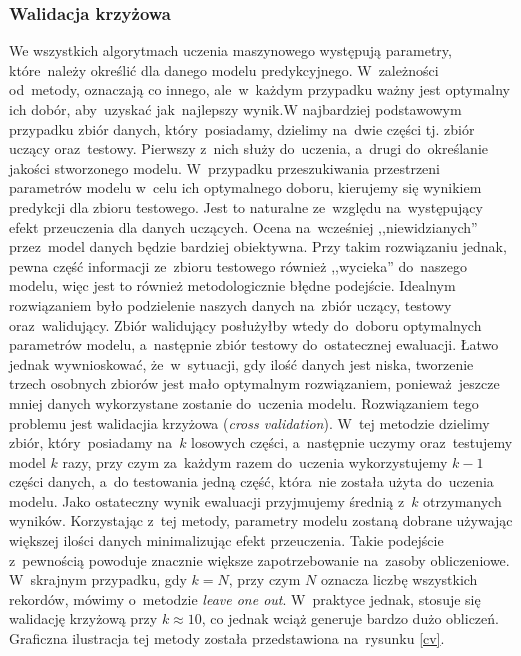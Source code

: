 \subsubsection{Walidacja krzyżowa}
We wszystkich algorytmach uczenia maszynowego występują parametry, które~należy określić dla danego modelu predykcyjnego. W~zależności od~metody, oznaczają co innego, ale~w~każdym przypadku ważny jest optymalny ich dobór, aby~uzyskać jak~najlepszy wynik.W najbardziej podstawowym przypadku zbiór danych, który~posiadamy, dzielimy na~dwie części tj. zbiór uczący oraz~testowy. Pierwszy z~nich służy do~uczenia, a~drugi do~określanie jakości stworzonego modelu. W~przypadku przeszukiwania przestrzeni parametrów modelu w~celu ich optymalnego doboru, kierujemy się wynikiem predykcji dla zbioru testowego. Jest to naturalne ze~względu na~występujący efekt przeuczenia dla danych uczących. Ocena na~wcześniej ,,niewidzianych'' przez~model danych będzie bardziej obiektywna. Przy takim rozwiązaniu jednak, pewna część informacji ze~zbioru testowego również ,,wycieka'' do~naszego modelu, więc jest to również metodologicznie błędne podejście. Idealnym rozwiązaniem było podzielenie naszych danych na~zbiór uczący, testowy oraz~walidujący. Zbiór walidujący posłużyłby wtedy do~doboru optymalnych parametrów modelu, a~następnie zbiór testowy do~ostatecznej ewaluacji. Łatwo jednak wywnioskować, że~w~sytuacji, gdy ilość danych jest niska, tworzenie trzech osobnych zbiorów jest mało optymalnym rozwiązaniem, ponieważ~jeszcze mniej danych wykorzystane zostanie do~uczenia modelu. Rozwiązaniem tego problemu jest walidacjia krzyżowa (\textit{cross validation}). W~tej metodzie dzielimy zbiór, który~posiadamy na~$k$ losowych części, a~następnie uczymy oraz~testujemy model $k$ razy, przy czym za~każdym razem do~uczenia wykorzystujemy $k-1$ części danych, a~do testowania jedną część, która~nie została użyta do~uczenia modelu. Jako ostateczny wynik ewaluacji przyjmujemy średnią z~$k$ otrzymanych wyników. Korzystając z~tej metody, parametry modelu zostaną dobrane używając większej ilości danych minimalizując efekt przeuczenia. Takie podejście z~pewnością powoduje znacznie większe zapotrzebowanie na~zasoby obliczeniowe. W~skrajnym przypadku, gdy $k=N$, przy czym $N$ oznacza liczbę wszystkich rekordów, mówimy o~metodzie \textit{leave one out}. W~praktyce jednak, stosuje się walidację krzyżową przy $k \approx 10$, co jednak wciąż generuje bardzo dużo obliczeń. Graficzna ilustracja tej metody została przedstawiona na~rysunku \ref{cv}.

